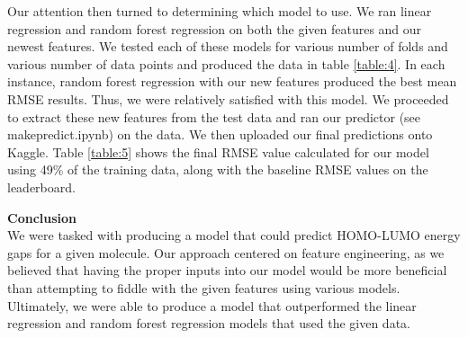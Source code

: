 \documentclass[12pt]{article}
\begin{document}
Our attention then turned to determining which model to use. We ran linear regression and random forest regression on both the given features and our newest features. We tested each of these models for various number of folds and various number of data points and produced the data in table \ref{table:4}. In each instance, random forest regression with our new features produced the best mean RMSE results. Thus, we were relatively satisfied with this model. We proceeded to extract these new features from the test data and ran our predictor (see makepredict.ipynb) on the data. We then uploaded our final predictions onto Kaggle. Table \ref{table:5} shows the final RMSE value calculated for our model using 49\% of the training data, along with the baseline RMSE values on the leaderboard. \\

\bigskip

\textbf{Conclusion} \\
We were tasked with producing a model that could predict HOMO-LUMO energy gaps for a given molecule. Our approach centered on feature engineering, as we believed that having the proper inputs into our model would be more beneficial than attempting to fiddle with the given features using various models. Ultimately, we were able to produce a model that outperformed the linear regression and random forest regression models that used the given data. 
\end{document}
